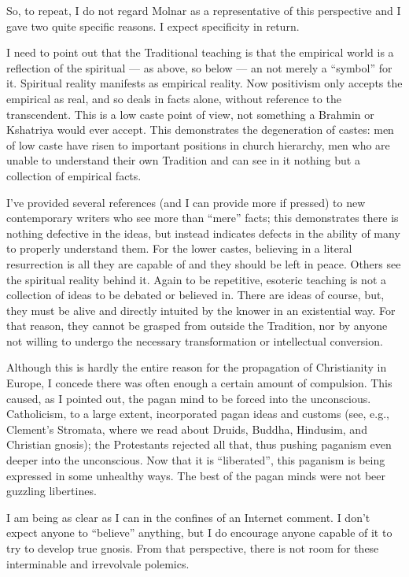 \begin{footnotesize}
\begin{sffamily}
So, to repeat, I do not regard Molnar as a representative of this perspective and I gave two quite specific reasons. I expect specificity in return.

I need to point out that the Traditional teaching is that the empirical world is a reflection of the spiritual --- as above, so below --- an not merely a ``symbol'' for it. Spiritual reality manifests as empirical reality. Now positivism only accepts the empirical as real, and so deals in facts alone, without reference to the transcendent. This is a low caste point of view, not something a Brahmin or Kshatriya would ever accept. This demonstrates the degeneration of castes: men of low caste have risen to important positions in church hierarchy, men who are unable to understand their own Tradition and can see in it nothing but a collection of empirical facts.

I've provided several references (and I can provide more if pressed) to new contemporary writers who see more than ``mere'' facts; this demonstrates there is nothing defective in the ideas, but instead indicates defects in the ability of many to properly understand them. For the lower castes, believing in a literal resurrection is all they are capable of and they should be left in peace. Others see the spiritual reality behind it. Again to be repetitive, esoteric teaching is not a collection of ideas to be debated or believed in. There are ideas of course, but, they must be alive and directly intuited by the knower in an existential way. For that reason, they cannot be grasped from outside the Tradition, nor by anyone not willing to undergo the necessary transformation or intellectual conversion.

Although this is hardly the entire reason for the propagation of Christianity in Europe, I concede there was often enough a certain amount of compulsion. This caused, as I pointed out, the pagan mind to be forced into the unconscious. Catholicism, to a large extent, incorporated pagan ideas and customs (see, e.g., Clement's Stromata, where we read about Druids, Buddha, Hindusim, and Christian gnosis); the Protestants rejected all that, thus pushing paganism even deeper into the unconscious. Now that it is ``liberated'', this paganism is being expressed in some unhealthy ways. The best of the pagan minds were not beer guzzling libertines.

I am being as clear as I can in the confines of an Internet comment. I don't expect anyone to ``believe'' anything, but I do encourage anyone capable of it to try to develop true gnosis. From that perspective, there is not room for these interminable and irrevolvale polemics.


\hfill

\end{sffamily}
\end{footnotesize}

